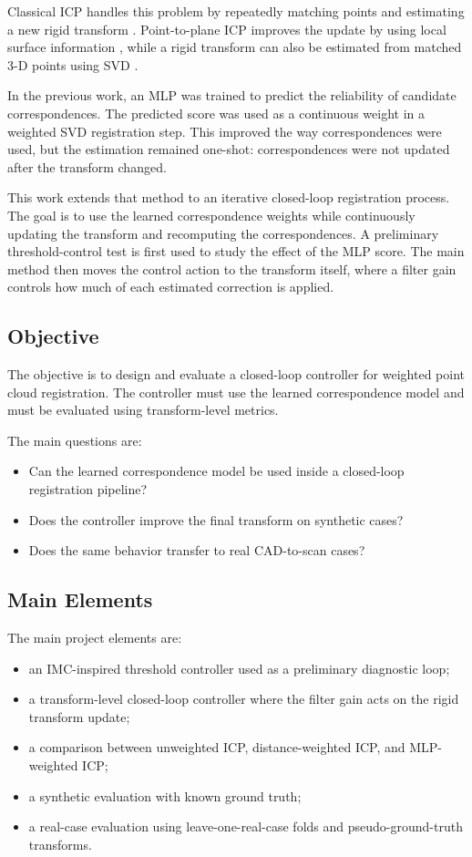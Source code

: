 \documentclass[conference]{IEEEtran}
\begin{document}
Classical ICP handles this problem by repeatedly matching points and estimating a new rigid transform \cite{besl1992icp}. Point-to-plane ICP improves the update by using local surface information \cite{chen1992object}, while a rigid transform can also be estimated from matched 3-D points using SVD \cite{arun1987least}.

In the previous work, an MLP was trained to predict the reliability of candidate correspondences. The predicted score was used as a continuous weight in a weighted SVD registration step. This improved the way correspondences were used, but the estimation remained one-shot: correspondences were not updated after the transform changed.

This work extends that method to an iterative closed-loop registration process. The goal is to use the learned correspondence weights while continuously updating the transform and recomputing the correspondences. A preliminary threshold-control test is first used to study the effect of the MLP score. The main method then moves the control action to the transform itself, where a filter gain controls how much of each estimated correction is applied.

\subsection{Objective}
\label{subsec:objective}

The objective is to design and evaluate a closed-loop controller for weighted point cloud registration. The controller must use the learned correspondence model and must be evaluated using transform-level metrics.

The main questions are:
\begin{itemize}
    \item Can the learned correspondence model be used inside a closed-loop registration pipeline?
    \item Does the controller improve the final transform on synthetic cases?
    \item Does the same behavior transfer to real CAD-to-scan cases?
\end{itemize}

\subsection{Main Elements}
\label{subsec:elements}

The main project elements are:
\begin{itemize}
    \item an IMC-inspired threshold controller used as a preliminary diagnostic loop;
    \item a transform-level closed-loop controller where the filter gain acts on the rigid transform update;
    \item a comparison between unweighted ICP, distance-weighted ICP, and MLP-weighted ICP;
    \item a synthetic evaluation with known ground truth;
    \item a real-case evaluation using leave-one-real-case folds and pseudo-ground-truth transforms.
\end{itemize}
\end{document}
